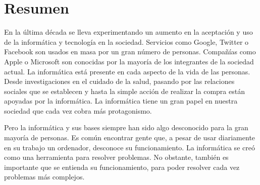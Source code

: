 

\setcounter{page}{3}








\chapter*{Resumen} %

En la última década se lleva experimentando un aumento en la aceptación y uso de la informática y tecnología en la sociedad. Servicios como Google, Twitter o Facebook son usados en masa por un gran número de personas. Compañías como Apple o Microsoft son conocidas por la mayoría de los integrantes de la sociedad actual. La informática está presente en cada aspecto de la vida de las personas. Desde investigaciones en el cuidado de la salud, pasando por las relaciones sociales que se establecen y hasta la simple acción de realizar la compra están apoyadas por la informática. La informática tiene un gran papel en nuestra sociedad que cada vez cobra más protagonismo. 

Pero la informática y sus bases siempre han sido algo desconocido para la gran mayoría de personas. Es común encontrar gente que, a pesar de usar diariamente en su trabajo un ordenador, desconoce su funcionamiento. La informática se creó como una herramienta para resolver problemas. No obstante, también es importante que se entienda su funcionamiento, para poder resolver cada vez problemas más complejos.

